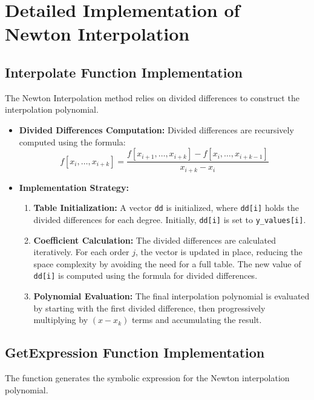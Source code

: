 \documentclass{article}
\begin{document}
\section{Detailed Implementation of Newton Interpolation}

\subsection{Interpolate Function Implementation}
The Newton Interpolation method relies on divided differences to construct the interpolation polynomial.

\begin{itemize}
    \item \textbf{Divided Differences Computation:}
    Divided differences are recursively computed using the formula:
    \[
    f[x_i,\ldots,x_{i+k}] = \frac{f[x_{i+1},\ldots,x_{i+k}] - f[x_i,\ldots,x_{i+k-1}]}{x_{i+k} - x_i}
    \]
    
    \item \textbf{Implementation Strategy:}
    \begin{enumerate}
        \item \textbf{Table Initialization:} A vector \texttt{dd} is initialized, where \texttt{dd[i]} holds the divided differences for each degree. Initially, \texttt{dd[i]} is set to \texttt{y\_values[i]}.
        
        \item \textbf{Coefficient Calculation:} The divided differences are calculated iteratively. For each order \( j \), the vector is updated in place, reducing the space complexity by avoiding the need for a full table. The new value of \texttt{dd[i]} is computed using the formula for divided differences.
        
        \item \textbf{Polynomial Evaluation:} The final interpolation polynomial is evaluated by starting with the first divided difference, then progressively multiplying by \( (x - x_k) \) terms and accumulating the result.
    \end{enumerate}
\end{itemize}

\subsection{GetExpression Function Implementation}
The function generates the symbolic expression for the Newton interpolation polynomial.
\end{document}
